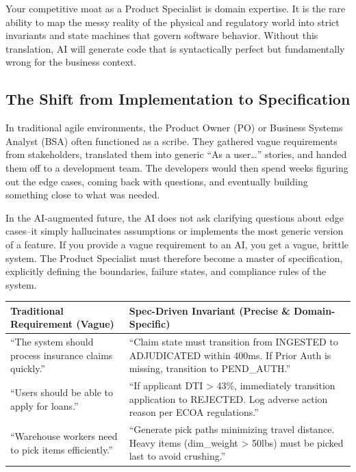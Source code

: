 \documentclass[
  11pt,
  openany,
  oneside]{book}
\begin{document}
Your competitive moat as a Product Specialist is domain expertise. It is
the rare ability to map the messy reality of the physical and regulatory
world into strict invariants and state machines that govern software
behavior. Without this translation, AI will generate code that is
syntactically perfect but fundamentally wrong for the business context.

\subsection{The Shift from Implementation to
Specification}\label{the-shift-from-implementation-to-specification}

In traditional agile environments, the Product Owner (PO) or Business
Systems Analyst (BSA) often functioned as a scribe. They gathered vague
requirements from stakeholders, translated them into generic ``As a
user\ldots{}'' stories, and handed them off to a development team. The
developers would then spend weeks figuring out the edge cases, coming
back with questions, and eventually building something close to what was
needed.

In the AI-augmented future, the AI does not ask clarifying questions
about edge cases--it simply hallucinates assumptions or implements the
most generic version of a feature. If you provide a vague requirement to
an AI, you get a vague, brittle system. The Product Specialist must
therefore become a master of specification, explicitly defining the
boundaries, failure states, and compliance rules of the system.

\begin{longtable}[]{@{}
  >{\raggedright\arraybackslash}p{}
  >{\raggedright\arraybackslash}p{}@{}}
\toprule\noalign{}
\begin{minipage}[b]{\linewidth}\raggedright
Traditional Requirement (Vague)
\end{minipage} & \begin{minipage}[b]{\linewidth}\raggedright
Spec-Driven Invariant (Precise \& Domain-Specific)
\end{minipage} \\
\midrule\noalign{}
\endhead
\bottomrule\noalign{}
\endlastfoot
``The system should process insurance claims quickly.'' & ``Claim state
must transition from INGESTED to ADJUDICATED within 400ms. If Prior Auth
is missing, transition to PEND\_AUTH.'' \\
``Users should be able to apply for loans.'' & ``If applicant DTI
\textgreater{} 43\%, immediately transition application to REJECTED. Log
adverse action reason per ECOA regulations.'' \\
``Warehouse workers need to pick items efficiently.'' & ``Generate pick
paths minimizing travel distance. Heavy items (dim\_weight
\textgreater{} 50lbs) must be picked last to avoid crushing.'' \\
\end{longtable}
\end{document}
